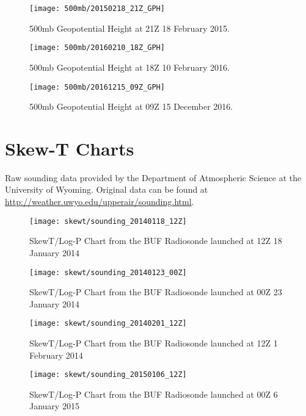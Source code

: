 \begin{figure}
\texttt{[image: 500mb/20150218\_21Z\_GPH]}
\caption{500mb Geopotential Height at 21Z 18 February 2015.} 
\label{fig:gph_20150218}
\end{figure}


\begin{figure}
\texttt{[image: 500mb/20160210\_18Z\_GPH]}
\caption{500mb Geopotential Height at 18Z 10 February 2016.} 
\label{fig:gph_20160210}
\end{figure}


\begin{figure}
\texttt{[image: 500mb/20161215\_09Z\_GPH]}
\caption{500mb Geopotential Height at 09Z 15 December 2016.} 
\label{fig:gph_20161215}
\end{figure}

\section{Skew-T Charts}
Raw sounding data provided by the Department of Atmospheric Science at the University of Wyoming. Original data can be found at \url{http://weather.uwyo.edu/upperair/sounding.html}.
\begin{figure}
\texttt{[image: skewt/sounding\_20140118\_12Z]}
\caption{SkewT/Log-P Chart from the BUF Radiosonde launched at 12Z 18 January 2014} 
\label{fig:skewt_20140123}
\end{figure}

\begin{figure}
\texttt{[image: skewt/sounding\_20140123\_00Z]}
\caption{SkewT/Log-P Chart from the BUF Radiosonde launched at 00Z 23 January 2014} 
\label{fig:skewt_20140123}
\end{figure}

\begin{figure}
\texttt{[image: skewt/sounding\_20140201\_12Z]}
\caption{SkewT/Log-P Chart from the BUF Radiosonde launched at 12Z 1 February 2014} 
\label{fig:skewt_20140201}
\end{figure}

\begin{figure}
\texttt{[image: skewt/sounding\_20150106\_12Z]}
\caption{SkewT/Log-P Chart from the BUF Radiosonde launched at 00Z 6 January 2015} 
\label{fig:skewt_20150106}
\end{figure}

